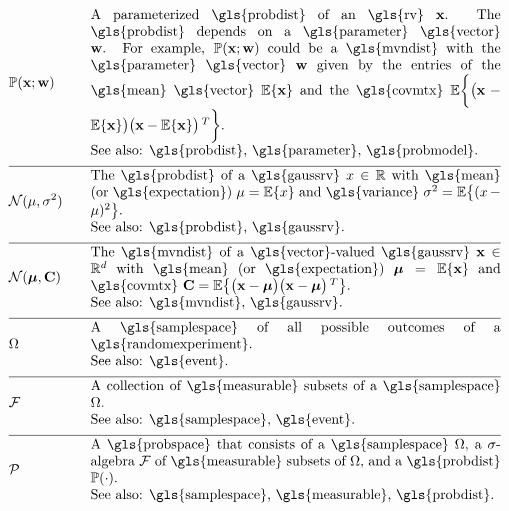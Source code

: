 \newpage
\begin{align} 
	&\prob{\featurevec;\weights} &\quad & \parbox{.85\textwidth}{A parameterized \gls{probdist} of an \gls{rv} $\featurevec$. 
		The \gls{probdist} depends on a \gls{parameter} \gls{vector} $\weights$. For example, $\prob{\featurevec;\weights}$ could be a 
		\gls{mvndist} with the \gls{parameter} \gls{vector} $\weights$ given by the entries of the \gls{mean} \gls{vector} $\expect \{ \featurevec \}$ 
		and the \gls{covmtx} $\expect \bigg \{ \big( \featurevec - \expect \{ \featurevec \}\big) \big( \featurevec - \expect \{ \featurevec \}\big)\,^{T}  \bigg\}$.
		\\ See also: \gls{probdist}, \gls{parameter}, \gls{probmodel}.} \nonumber \\[2mm] \hline \nonumber\\[-5mm]
	&\mathcal{N}(\mu, \sigma^{2}) &\quad & \parbox{.85\textwidth}{The \gls{probdist} of a 
		\gls{gaussrv} $\feature \in \mathbb{R}$ with \gls{mean} (or \gls{expectation}) $\mu= \expect \{ \feature \}$ 
		and \gls{variance} $\sigma^{2} =   \expect \big\{  (  \feature - \mu )^2 \big\}$.
		\\ See also: \gls{probdist}, \gls{gaussrv}.} \nonumber \\[2mm] \hline \nonumber\\[-5mm]
	&\mathcal{N}(\meanvecgeneric, \mathbf{C}) &\quad & \parbox{.85\textwidth}{The \gls{mvndist} of a \gls{vector}-valued 
		\gls{gaussrv} $\featurevec \in \mathbb{R}^{\featuredim}$ with \gls{mean} (or \gls{expectation}) $\meanvecgeneric= \expect \{ \featurevec \}$ 
		and \gls{covmtx} $\mathbf{C} =  \expect \big\{ \big( \featurevec - \meanvecgeneric \big)\big( \featurevec - \meanvecgeneric \big)\,^{T} \big\}$.
		\\ See also: \gls{mvndist}, \gls{gaussrv}.} \nonumber \\[2mm] \hline \nonumber\\[-5mm]  
	&\Omega &\quad & \parbox{.85\textwidth}{A \gls{samplespace} of all possible outcomes of a \gls{randomexperiment}. 
		\\ See also: \gls{event}.}  \nonumber \\[2mm] \hline \nonumber\\[-5mm]
	&\mathcal{F} &\quad & \parbox{.85\textwidth}{A collection of \gls{measurable} subsets of a \gls{samplespace} $\Omega$. 
		\\ See also: \gls{samplespace}, \gls{event}.}  \nonumber \\[2mm] \hline \nonumber\\[-5mm]
	&\mathcal{P} &\quad & \parbox{.85\textwidth}{A \gls{probspace} that consists of a \gls{samplespace} $\Omega$, a 
		$\sigma$-algebra $\mathcal{F}$ of \gls{measurable} subsets of $\Omega$, and a \gls{probdist} $\prob{ \cdot}$.
		\\ See also: \gls{samplespace}, \gls{measurable}, \gls{probdist}.} \nonumber                                       
\end{align}





